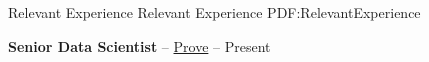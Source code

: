 \documentclass[letterpaper,MMMyyyy,nonstopmode]{simpleresumecv}
\begin{document}
\begin{Body}







\vspace{3mm}


\Section
{Relevant Experience}
{Relevant Experience}
{PDF:RelevantExperience}

\Entry
\begin{Detail}

\textbf{Senior Data Scientist} -- \href{https://www.prove.com/}{Prove} \hfill {} \hspace{1mm} -- \hspace{1mm} Present


\end{Detail}
\end{Body}
\end{document}
